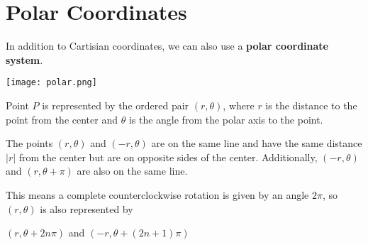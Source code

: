 \section{Polar Coordinates}
  In addition to Cartisian coordinates, we can also use a \textbf{polar coordinate system}.
  \begin{center}
    \texttt{[image: polar.png]}
  \end{center}
  Point $P$ is represented by the ordered pair $(r,\theta)$, where $r$ is the distance to the point from the center and $\theta$ is the angle from the polar axis to the point.
  \par
  The points $(r,\theta)$ and $(-r,\theta)$ are on the same line and have the same distance $|r|$ from the center but are on opposite sides of the center. Additionally, $(-r,\theta)$ and $(r,\theta+\pi)$ are also on the same line.
  \par
  This means a complete counterclockwise rotation is given by an angle $2\pi$, so $(r,\theta)$ is also represented by
  \begin{center}
    $(r,\theta+2n\pi)$ and $(-r,\theta+(2n+1)\pi)$
  \end{center}
